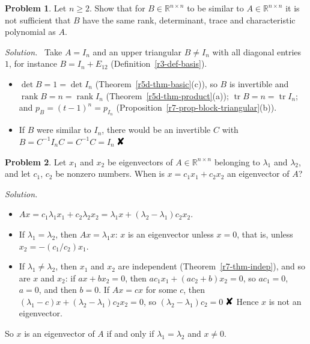 \documentclass[12pt]{article}
\newcommand{\R}{\mathbb R}
\newcommand{\contradiction}{\mathord{\text{\large\ding{56}}}}
\DeclareMathOperator{\tr}{tr}
\DeclareMathOperator{\rank}{rank}
\theoremstyle{definition}
\newtheorem{problem}{Problem}
\newenvironment{solution}{\par\noindent\textit{Solution.}\ }{\par\smallskip}
\begin{document}
\begin{problem}\label{r7-ex-not-similar}
Let \(n\geqslant2\). Show that for \(B\in\R^{n\times n}\) to be similar to \(A\in\R^{n\times n}\) it is not sufficient that
\(B\) have the same rank, determinant, trace and characteristic polynomial as \(A\).
\end{problem}
\begin{solution}
Take \(A=I_n\) and an upper triangular \(B\ne I_n\) with all diagonal entries \(1\), for instance \(B=I_n+E_{12}\)
(Definition~\ref{r3-def-basis}).
\begin{itemize}
\item \(\det B=1=\det I_n\) (Theorem~\ref{r5d-thm-basic}(c)), so \(B\) is invertible and \(\rank B=n=\rank I_n\)
(Theorem~\ref{r5d-thm-product}(a)); \(\tr B=n=\tr I_n\); and \(p_B=(t-1)^n=p_{I_n}\)
(Proposition~\ref{r7-prop-block-triangular}(b)).
\item If \(B\) were similar to \(I_n\), there would be an invertible \(C\) with \(B=C^{-1}I_nC=C^{-1}C=I_n\) \(\contradiction\)
\end{itemize}
\end{solution}

\begin{problem}\label{r7-ex-sum-eigenvectors}
Let \(x_1\) and \(x_2\) be eigenvectors of \(A\in\R^{n\times n}\) belonging to \(\lambda_1\) and \(\lambda_2\), and let
\(c_1\), \(c_2\) be nonzero numbers. When is \(x=c_1x_1+c_2x_2\) an eigenvector of \(A\)?
\end{problem}
\begin{solution}
\begin{itemize}
\item \(Ax=c_1\lambda_1x_1+c_2\lambda_2x_2=\lambda_1x+(\lambda_2-\lambda_1)c_2x_2\).
\item If \(\lambda_1=\lambda_2\), then \(Ax=\lambda_1x\): \(x\) is an eigenvector unless \(x=0\), that is, unless
\(x_2=-(c_1/c_2)x_1\).
\item If \(\lambda_1\ne\lambda_2\), then \(x_1\) and \(x_2\) are independent (Theorem~\ref{r7-thm-indep}), and so are \(x\) and
\(x_2\): if \(ax+bx_2=0\), then \(ac_1x_1+(ac_2+b)x_2=0\), so \(ac_1=0\), \(a=0\), and then \(b=0\). If \(Ax=cx\) for some
\(c\), then \((\lambda_1-c)x+(\lambda_2-\lambda_1)c_2x_2=0\), so \((\lambda_2-\lambda_1)c_2=0\) \(\contradiction\) Hence \(x\)
is not an eigenvector.
\end{itemize}
So \(x\) is an eigenvector of \(A\) if and only if \(\lambda_1=\lambda_2\) and \(x\ne0\).
\end{solution}
\end{document}

